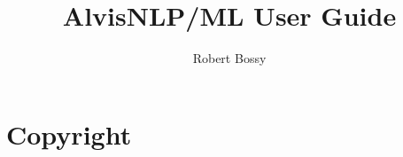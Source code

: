 \documentclass[a4paper]{book}
\title{AlvisNLP/ML User Guide \version}
\author{Robert Bossy}
\begin{document}
\maketitle
\tableofcontents

\chapter{Copyright}
\license




\end{document}
